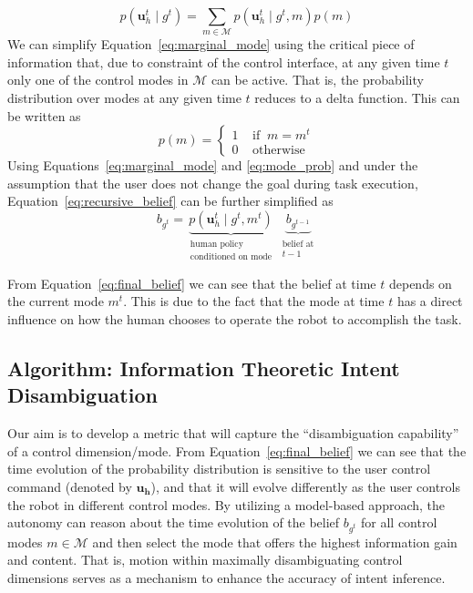 \documentclass[letterpaper, 10 pt, conference]{ieeeconf}  %
\begin{document}
\begin{equation} \label{eq:marginal_mode}
	p(\boldsymbol{u}_h^t \;|\; g^t) = \sum_{m \in \mathcal{M}}^{} p(\boldsymbol{u}_h^t \;|\; g^t, m)p(m)
\end{equation}
We can simplify Equation~\ref{eq:marginal_mode} using the critical piece of information that, due to constraint of the control interface, at any given time $t$ only one of the control modes in $\mathcal{M}$ can be active. That is, the probability distribution over modes at any given time $t$ reduces to a delta function. This can be written as
\begin{equation}\label{eq:mode_prob}
	p(m) = \begin{cases}
		1 \;\;\;\; \text{if} \;\; m = m^t \\
		0 \;\;\;\; \text{otherwise}
	\end{cases}
\end{equation}
Using Equations~\ref{eq:marginal_mode} and \ref{eq:mode_prob} and under the assumption that the user does not change the goal during task execution, Equation~\ref{eq:recursive_belief} can be further simplified as 
\begin{equation}\label{eq:final_belief}
	b_{g^t} = \underbrace{p(\boldsymbol{u}_h^t \;|\; g^t, m^t )}_{\substack{\text{human policy} \\ \text{conditioned on mode}}}\;\underbrace{b_{g^{t-1}}}_{\substack{\text{belief at}\\ \text{$t-1$}}}
\end{equation}

From Equation~\ref{eq:final_belief} we can see that the belief at time $t$ depends on the current mode $m^t$. This is due to the fact that the mode at time $t$ has a direct influence on how the human chooses to operate the robot to accomplish the task. 

\subsection{Algorithm: Information Theoretic Intent Disambiguation}

Our aim is to develop a metric that will capture the ``disambiguation capability'' of a control dimension/mode. 
From Equation~\ref{eq:final_belief} we can see that the time evolution of the probability distribution is sensitive to the user control command (denoted by $\boldsymbol{u_h}$), and that it will evolve differently as the user controls the robot in different control modes. By utilizing a model-based approach, the autonomy can reason about the time evolution of the belief $b_{g^t}$ for all control modes $m \in \mathcal{M}$ and then select the mode that offers the highest information gain and content. That is, motion within maximally disambiguating control dimensions serves as a mechanism to enhance the accuracy of intent inference. 
\end{document}
